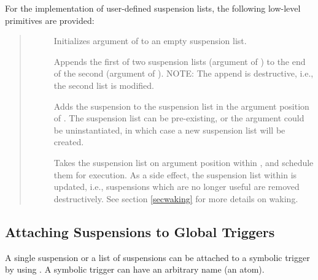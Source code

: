 For the implementation of user-defined suspension lists,
the following low-level primitives are provided:
\begin{quote}
\begin{description}
\item[]
    Initializes argument  of  to an empty
    suspension list.
\item[]
    Appends the first of two suspension lists (argument
     of
    ) to
    the end of the second (argument  of ). NOTE: The
    append is destructive, i.e., the second list is modified.
\item[]
    Adds the suspension  to the suspension list in the
    argument position  of . The suspension list can be
    pre-existing,
    or the argument could be uninstantiated, in which case a new suspension
    list will be created.
\item[]
    Takes the suspension list on argument position  within
    , and schedule them for execution.
    As a side effect, the suspension list within  is updated,
    i.e., suspensions which are no longer useful are removed destructively.
    See section \ref{secwaking} for more details on waking.
\end{description}
\end{quote}


\subsection{Attaching Suspensions to Global Triggers}
A single suspension or a list of suspensions can be attached to a
symbolic trigger by using
.
A symbolic trigger can have an arbitrary name (an atom).





